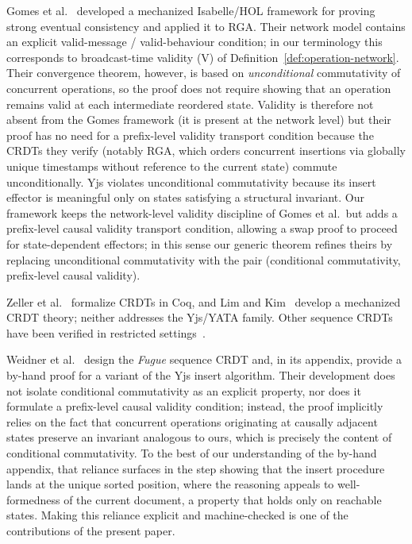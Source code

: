 \documentclass[sigplan,screen]{acmart}
\begin{document}
Gomes et al.~\cite{Gomes2017,GomesRGA2017} developed a mechanized
Isabelle/HOL framework for proving strong eventual consistency and
applied it to RGA.  Their network model contains an explicit
valid-message / valid-behaviour condition; in our terminology this
corresponds to broadcast-time validity (V) of
Definition~\ref{def:operation-network}.  Their convergence theorem,
however, is based on \emph{unconditional} commutativity of concurrent
operations, so the proof does not require showing that an operation
remains valid at each intermediate reordered state.  Validity is therefore not
absent from the Gomes framework (it is present at the network level) but
their proof has no need for a prefix-level validity transport condition
because the CRDTs they verify (notably RGA, which orders concurrent
insertions via globally unique timestamps without reference to the
current state) commute unconditionally.  Yjs violates unconditional
commutativity because its insert effector is meaningful only on states
satisfying a structural invariant.  Our framework keeps the network-level
validity discipline of Gomes et al.\ but adds a prefix-level causal
validity transport condition, allowing a swap proof to proceed for
state-dependent effectors; in this sense our generic theorem refines
theirs by replacing unconditional commutativity with the pair
(conditional commutativity, prefix-level causal validity).

Zeller et al.~\cite{Zeller2014} formalize CRDTs in Coq, and
Lim and Kim~\cite{Lim2019} develop a mechanized CRDT theory; neither
addresses the Yjs/YATA family.  Other sequence CRDTs have been verified
in restricted settings~\cite{Netzell2020}.

Weidner et al.~\cite{Weidner2023} design the \emph{Fugue} sequence CRDT
and, in its appendix, provide a by-hand proof for a variant of the Yjs
insert algorithm.  Their development does not isolate conditional
commutativity as an explicit property, nor does it formulate a
prefix-level causal validity condition; instead, the proof implicitly
relies on the fact that concurrent operations originating at causally
adjacent states preserve an invariant analogous to ours, which is
precisely the content of conditional commutativity.  To the best of our
understanding of the by-hand appendix, that reliance surfaces in the
step showing that the insert procedure lands at the unique sorted position,
where the reasoning appeals to well-formedness of the current
document, a property that holds only on reachable states.  Making this
reliance explicit and machine-checked is one of the contributions of the
present paper.
\end{document}
